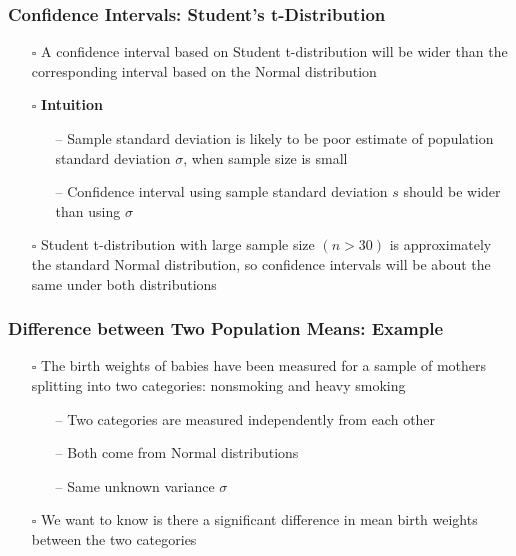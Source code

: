 \documentclass[handout]{beamer}
\begin{document}
\begin{frame}
    \frametitle{Confidence Intervals: Student's t-Distribution}
    \begin{itemize}[wide = 0pt]
        \item[$\square$] A confidence interval based on Student t-distribution will be {\color{red}wider} than the corresponding interval based on the Normal distribution
        \item[$\square$] \textbf{Intuition}
        \begin{itemize}
            \item[--] Sample standard deviation is likely to be poor estimate of population standard deviation $\sigma$, when sample size is small
            \item[--] Confidence interval using sample standard deviation $s$ should be wider than using $\sigma$
        \end{itemize}
        \item[$\square$] Student t-distribution with large sample size $(n>30)$ is approximately the standard Normal distribution, so confidence intervals will be about the same under both distributions
    \end{itemize}
    \vspace*{\fill}
\end{frame}

\begin{frame}
    \frametitle{Difference between Two Population Means: Example}
    \begin{itemize}[wide = 0pt]
        \item[$\square$] The birth weights of babies have been measured for a sample of mothers splitting into two categories: nonsmoking and heavy smoking
        \begin{itemize}
            \item[--] Two categories are measured independently from each other
            \item[--] Both come from Normal distributions
            \item[--] Same unknown variance $\sigma$
        \end{itemize}
        \item[$\square$] We want to know is there a significant difference in mean birth weights between the two categories
    \end{itemize}
    \vspace*{\fill}
\end{frame}
\end{document}
